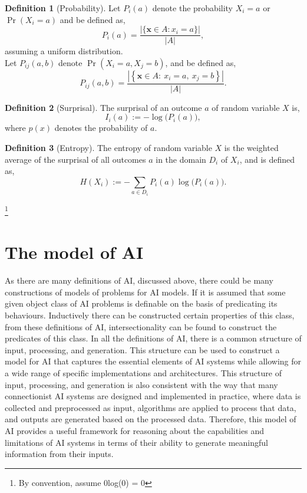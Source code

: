 \documentclass[stu,12pt]{apa7}
\theoremstyle{definition}
\newtheorem{definition}{Definition}[section]
\begin{document}
\begin{definition}[Probability]
    Let $P_i(a)$ denote the probability $X_i = a$ or $\Pr (X_i=a)$ and be defined as,
\[
P_i(a)=\frac{|\{\mathbf{x} \in A: x_i=a\}|}{|A|},
\] assuming a uniform distribution. \\
    Let $P_{ij}(a,b)$ denote $\Pr (X_i=a,X_j=b)$, and be defined as,
    \[
    P_{ij}(a,b)=\frac{\left|\left\{\mathbf{x}\in A:\ x_i=a,\ x_j=b\right\}\right|}{|A|}.
    \]
        
    
\end{definition}
\begin{definition}[Surprisal]
    The surprisal of an outcome $a$ of random variable $X$ is,
    \[
    I_i(a) := -\log\!\bigl(P_i(a)\bigr),
    \]
    where $p(x)$ denotes the probability of $a$.
\end{definition}
\begin{definition}[Entropy]\footnotemark[2]
    The entropy of random variable $X$ is the weighted average of the surprisal of all outcomes $a$ in the domain $D_i$ of $X_i$, and is defined as,
    \[
    H(X_i) := -\sum_{a \in D_i} P_i(a)\log\!\bigl(P_i(a)\bigr).
    \]
\end{definition}
\footnote{By convention, assume 0log(0) = 0}
\section{The model of AI}

As there are many definitions of AI, discussed above, there could be many constructions of models of problems for AI models. If it is assumed that some given object class of AI problems is definable on the basis of predicating its behaviours. Inductively there can be constructed certain properties of this class, from these definitions of AI, intersectionality can be found to construct the predicates of this class. In all the definitions of AI, there is a common structure of input, processing, and generation. This structure can be used to construct a model for AI that captures the essential elements of AI systems while allowing for a wide range of specific implementations and architectures. This structure of input, processing, and generation is also consistent with the way that many connectionist AI systems are designed and implemented in practice, where data is collected and preprocessed as input, algorithms are applied to process that data, and outputs are generated based on the processed data. Therefore, this model of AI provides a useful framework for reasoning about the capabilities and limitations of AI systems in terms of their ability to generate meaningful information from their inputs.
\end{document}
